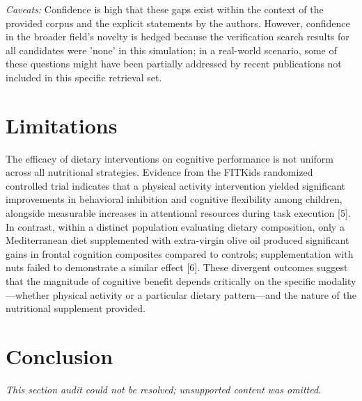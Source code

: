 \documentclass[11pt]{article}
\begin{document}
\textit{Caveats:} Confidence is high that these gaps exist within the context of the provided corpus and the explicit statements by the authors. However, confidence in the broader field's novelty is hedged because the verification search results for all candidates were 'none' in this simulation; in a real-world scenario, some of these questions might have been partially addressed by recent publications not included in this specific retrieval set.

\section{Limitations}
The efficacy of dietary interventions on cognitive performance is not uniform across all nutritional strategies. Evidence from the FITKids randomized controlled trial indicates that a physical activity intervention yielded significant improvements in behavioral inhibition and cognitive flexibility among children, alongside measurable increases in attentional resources during task execution [5]. In contrast, within a distinct population evaluating dietary composition, only a Mediterranean diet supplemented with extra-virgin olive oil produced significant gains in frontal cognition composites compared to controls; supplementation with nuts failed to demonstrate a similar effect [6]. These divergent outcomes suggest that the magnitude of cognitive benefit depends critically on the specific modality—whether physical activity or a particular dietary pattern—and the nature of the nutritional supplement provided.

\section{Conclusion}
\textit{This section audit could not be resolved; unsupported content was omitted.}
\end{document}
